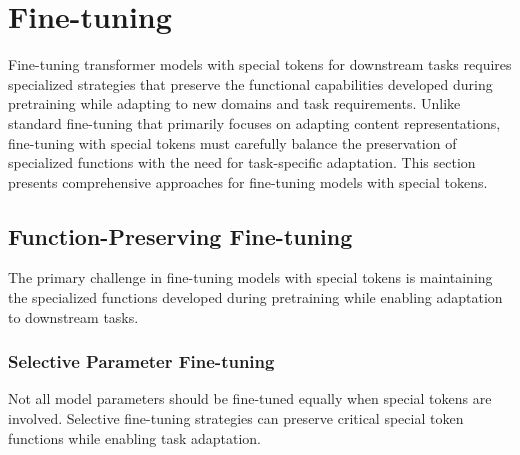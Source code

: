 
\section{Fine-tuning}

Fine-tuning transformer models with special tokens for downstream tasks requires specialized strategies that preserve the functional capabilities developed during pretraining while adapting to new domains and task requirements. Unlike standard fine-tuning that primarily focuses on adapting content representations, fine-tuning with special tokens must carefully balance the preservation of specialized functions with the need for task-specific adaptation. This section presents comprehensive approaches for fine-tuning models with special tokens.

\subsection{Function-Preserving Fine-tuning}

The primary challenge in fine-tuning models with special tokens is maintaining the specialized functions developed during pretraining while enabling adaptation to downstream tasks.

\subsubsection{Selective Parameter Fine-tuning}

Not all model parameters should be fine-tuned equally when special tokens are involved. Selective fine-tuning strategies can preserve critical special token functions while enabling task adaptation.

